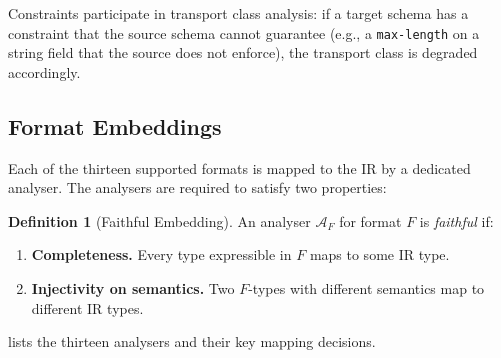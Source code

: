 \documentclass[11pt,a4paper]{article}
\theoremstyle{definition}
\newtheorem{definition}[theorem]{Definition}
\theoremstyle{remark}
\begin{document}
Constraints participate in transport class analysis: if a target schema
has a constraint that the source schema cannot guarantee (e.g., a
\texttt{max-length} on a string field that the source does not
enforce), the transport class is degraded accordingly.

\subsection{Format Embeddings}

Each of the thirteen supported formats is mapped to the IR by a
dedicated analyser. The analysers are required to satisfy two
properties:

\begin{definition}[Faithful Embedding]\label{def:faithful}
An analyser $\mathcal{A}_F$ for format $F$ is \emph{faithful} if:
\begin{enumerate}
  \item \textbf{Completeness.} Every type expressible in $F$ maps to
    some IR type.
  \item \textbf{Injectivity on semantics.} Two $F$-types with
    different semantics map to different IR types.
\end{enumerate}
\end{definition}

 lists the thirteen analysers and their key
mapping decisions.
\end{document}
